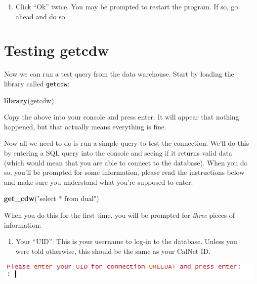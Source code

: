 \documentclass[]{book}
\newenvironment{Shaded}{\begin{snugshade}}{\end{snugshade}}
\newcommand{\KeywordTok}[1]{\textcolor[rgb]{0.13,0.29,0.53}{\textbf{#1}}}
\newcommand{\NormalTok}[1]{#1}
\newcommand{\StringTok}[1]{\textcolor[rgb]{0.31,0.60,0.02}{#1}}
\providecommand{\tightlist}{%
  \setlength{\itemsep}{0pt}\setlength{\parskip}{0pt}}
\begin{document}
\begin{enumerate}
\def\labelenumi{\arabic{enumi})}
\setcounter{enumi}{2}
\tightlist
\item
  Click ``Ok'' twice. You may be prompted to restart the program. If so, go ahead and do so.
\end{enumerate}

\hypertarget{testing-getcdw}{%
\section{Testing getcdw}\label{testing-getcdw}}

Now we can run a test query from the data warehouse. Start by loading the library called \texttt{getcdw}:

\begin{Shaded}
\begin{Highlighting}[]
\KeywordTok{library}\NormalTok{(getcdw)}
\end{Highlighting}
\end{Shaded}

Copy the above into your console and press enter. It will appear that nothing happened, but that actually means everything is fine.

Now all we need to do is run a simple query to test the connection. We'll do this by entering a SQL query into the console and seeing if it returns valid data (which would mean that you are able to connect to the database). When you do so, you'll be prompted for some information, please read the instructions below and make sure you understand what you're supposed to enter:

\begin{Shaded}
\begin{Highlighting}[]
\KeywordTok{get_cdw}\NormalTok{(}\StringTok{"select * from dual"}\NormalTok{)}
\end{Highlighting}
\end{Shaded}

When you do this for the first time, you will be prompted for \emph{three} pieces of information:

\begin{enumerate}
\def\labelenumi{\arabic{enumi})}
\tightlist
\item
  Your ``UID'': This is your username to log-in to the database. Unless you were told otherwise, this should be the same as your CalNet ID.
\end{enumerate}

\includegraphics[width=7.24in]{images/UID}
\end{document}
